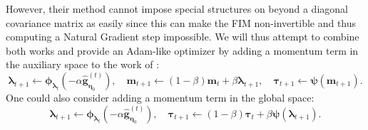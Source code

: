 \documentclass[a4paper, 11pt, oneside]{scrartcl}
\theoremstyle{break}
\newcommand{\matr}[1]{\boldsymbol{#1}}
\numberwithin{equation}{section}
\begin{document}
				However, their method cannot impose special structures on beyond a diagonal covariance matrix as easily since this can make the FIM non-invertible and thus computing a Natural Gradient step impossible. 
				We will thus attempt to combine both works and provide an Adam-like optimizer by adding a momentum term in the auxiliary space to the work of \parencite{LNK+21}:
				$$\matr{\lambda}_{t+1} \leftarrow \matr{\phi}_{\matr{\lambda}_t}(-\alpha \matr{\hat{g}}_{\matr{\eta}_0}^{(t)}), \quad \matr{m}_{t+1} \leftarrow (1-\beta) \matr{m}_t + \beta \matr{\lambda}_{t+1}, \quad \matr{\tau}_{t+1} \leftarrow \matr{\psi} (\matr{m}_{t+1}).$$
				One could also consider adding a momentum term in the global space:
				$$\matr{\lambda}_{t+1} \leftarrow \matr{\phi}_{\matr{\lambda}_t}(-\alpha \matr{\hat{g}}_{\matr{\eta}_0}^{(t)}), \quad \matr{\tau}_{t+1} \leftarrow (1-\beta) \matr{\tau}_t + \beta \matr{\psi}(\matr{\lambda}_{t+1}).$$
\end{document}
